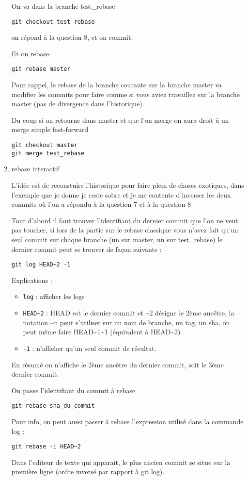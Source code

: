 \documentclass[10pt]{exam}
\begin{document}
\begin{questions}
\begin{enumerate}
On va dans la branche test\_rebase
\begin{lstlisting}
git checkout test_rebase
\end{lstlisting}
on répond à la question 8, et on commit.

Et on rebase.
\begin{lstlisting}
git rebase master
\end{lstlisting}
Pour rappel, le rebase de la branche courante sur la branche master va modifier les commits pour faire comme si vous aviez travaillez sur la branche master (pas de divergence dans l'historique).

Du coup si on retourne dans master et que l'on merge on aura droit à un merge simple fast-forward
\begin{lstlisting}
git checkout master
git merge test_rebase
\end{lstlisting}

\item rebase interactif

L'idée est de reconstuire l'historique pour faire plein de choses exotiques, dans l'exemple que je donne je reste sobre et je me contente d'inverser les deux commits où l'on a répondu à la question 7 et à la question 8

Tout d'abord il faut trouver l'identifiant du dernier commit que l'on ne veut pas toucher, si lors de la partie sur le rebase classique vous n'avez fait qu'un seul commit sur chaque branche (un sur master, un sur test\_rebase) le dernier commit peut se trouver de façon suivante :
\begin{lstlisting}
git log HEAD~2 -1
\end{lstlisting}

Explications :
\begin{itemize}
\item \texttt{log} : afficher les logs
\item \texttt{HEAD\~{}2} : HEAD est le dernier commit et \~{}2 désigne le 2ème ancêtre, la notation \~{}n peut s'utiliser sur un nom de branche, un tag, un sha, on peut même faire HEAD\~{}1\~{}1 (équivalent à HEAD\~{}2)
\item \texttt{-1} : n'afficher qu'un seul commit de résultat.
\end{itemize}
En résumé on n'affiche le 2ème ancêtre du dernier commit, soit le 3ème dernier commit.

On passe l'identifiant du commit à rebase

\begin{lstlisting}
git rebase sha_du_commit
\end{lstlisting}
Pour info, on peut aussi passer à rebase l'expression utilisé dans la commande log :
\begin{lstlisting}
git rebase -i HEAD~2
\end{lstlisting}
Dans l'editeur de texte qui apparait, le plus ancien commit se situe sur la première ligne (ordre inversé par rapport à git log).


\end{enumerate}
\end{questions}
\end{document}
